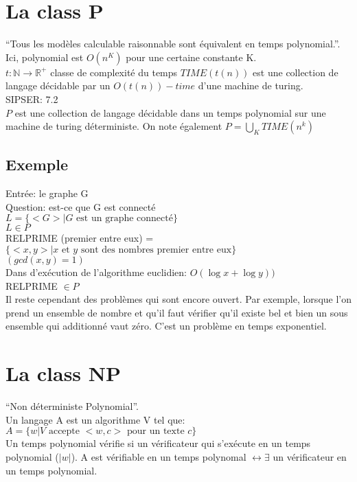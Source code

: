 \documentclass[a4paper,12pt]{article}
\begin{document}
\section{La class P}
  ``Tous les modèles calculable raisonnable sont équivalent en temps polynomial.''.  Ici, polynomial est $O(n^K)$ pour une certaine constante K.\\
  $t: \mathbb{N} \rightarrow \mathbb{R}^+$ classe de complexité du temps $TIME(t(n))$ est une collection de langage décidable par un $O(t(n))-time$ d'une machine de turing.\\
  SIPSER: 7.2\\
  
  $P$ est une collection de langage décidable dans un temps polynomial sur une machine de turing déterministe.  On note également $P = \bigcup_K TIME(n^k)$
  
  \subsection{Exemple}
    Entrée: le graphe G\\
    Question: est-ce que G est connecté\\
    $L = \{<G> | G \text{ est un graphe connecté}\}$\\
    $L \in P$\\
  
  RELPRIME (premier entre eux) = $\{<x, y> | x \text{ et } y \text{ sont des nombres premier entre eux}\}$\\
  $(gcd(x, y) = 1)$\\
  Dans d'exécution de l'algorithme euclidien: $O(\log x + \log y))$\\
  RELPRIME $\in P$\\
  
  Il reste cependant des problèmes qui sont encore ouvert.  Par exemple, lorsque l'on prend un ensemble de nombre et qu'il faut vérifier qu'il existe bel et bien un sous ensemble qui additionné vaut zéro.  C'est un problème en temps exponentiel.
  
\section{La class NP}
  ``Non déterministe Polynomial''.\\
  Un langage A est un algorithme V tel que: $A = \{w | V \text{ accepte } <w, c> \text{ pour un texte } c\}$\\
  Un temps polynomial vérifie si un vérificateur qui s'exécute en un temps polynomial ($|w|$).  A est vérifiable en un temps polynomal $\leftrightarrow \exists $ un vérificateur en un temps polynomial.
  
\end{document}
